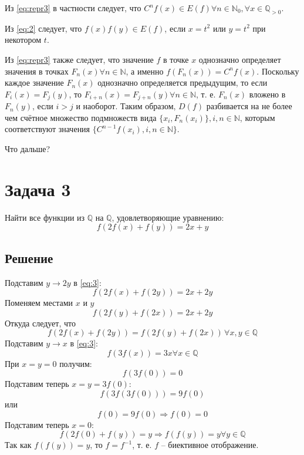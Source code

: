 \documentclass[11pt]{article}
\def\zall{\setcounter{lem}{0}\setcounter{cnsqnc}{0}\setcounter{th}{0}\setcounter{Cmt}{0}\setcounter{equation}{0}}
\newcounter{lem}\setcounter{lem}{0}
\newcounter{th}\setcounter{th}{0}
\newcounter{cnsqnc}\setcounter{cnsqnc}{0}
\newcounter{Cmt}\setcounter{Cmt}{0}
\begin{document}
Из \eqref{eq:repr3} в частности следует, что \(C^nf(x) \in E(f) \forall n \in \mathbb{N}_0, \forall x \in \mathbb{Q}_{>0}\).

Из \eqref{eq:2} следует, что \(f(x)f(y) \in E(f)\), если \(x = t^2\) или \(y = t^2\) при некотором \(t\).

Из \eqref{eq:repr3} также следует, что значение \(f\) в точке \(x\) однозначно определяет значения в точках \(F_n(x) \forall n \in \mathbb{N}\), а именно \(f(F_n(x)) = C^nf(x)\). Поскольку каждое значение \(F_n(x)\) однозначно определяется предыдущим, то если \(F_i(x) = F_j(y)\), то \(F_{i + n}(x) = F_{j + n}(y) \forall n \in \mathbb{N}\), т. е. \(F_n(x)\) вложено в \(F_n(y)\), если \(i > j\) и наоборот. Таким образом, \(D(f)\) разбивается на не более чем счётное множество подмножеств вида \(\{x_i, F_n(x_i)\}, i, n \in \mathbb{N}\), которым соответствуют значения \(\{C^{n - 1}f(x_i), i, n \in \mathbb{N}\}\).

Что дальше?

\pagebreak
\section{Задача 3}
\label{sec:org50770f4}
\zall
Найти все функции из \(\mathbb{Q}\) на \(\mathbb{Q}\), удовлетворяющие уравнению:
\begin{equation}\label{eq:3}
f(2f(x) + f(y)) = 2x + y
\end{equation}
\subsection{Решение}
\label{sec:org10b9b95}
Подставим \(y \to 2y\) в \eqref{eq:3}:
\begin{equation*}
f(2f(x) + f(2y)) = 2x + 2y
\end{equation*}
Поменяем местами \(x\) и \(y\)
\begin{equation*}
f(2f(y) + f(2x)) = 2x + 2y
\end{equation*}
Откуда следует, что
\begin{equation*}
f(2f(x) + f(2y)) = f(2f(y) + f(2x))\, \forall x, y \in \mathbb{Q}
\end{equation*}
Подставим \(y \to x\) в \eqref{eq:3}:
\begin{equation*}
f(3f(x)) = 3x \forall x \in \mathbb{Q}
\end{equation*}
При \(x = y = 0\) получим:
\begin{equation*}
f(3f(0)) = 0
\end{equation*}
Подставим теперь \(x = y = 3f(0)\):
\begin{equation*}
f(3f(3f(0))) = 9f(0)
\end{equation*}
или
\begin{equation}\label{eq:zeroval}
f(0) = 9f(0) \Rightarrow f(0) = 0
\end{equation}
Подставим теперь \(x = 0\):
\begin{equation}\label{eq:composition}
f(2f(0) + f(y)) = y \Rightarrow f(f(y)) = y \forall y \in \mathbb{Q}
\end{equation}
Так как \(f(f(y)) = y\), то \(f = f^{-1}\), т. е. \(f\) -- биективное отображение.
\end{document}
